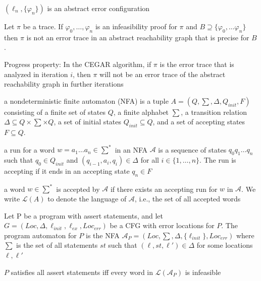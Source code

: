 \documentclass[landscape, a4paper]{article}
\begin{document}
\begin{minipage}[t]{0.2\linewidth}
\begin{betterlist}
\begin{betterlist}
			\item $(\ell_n, \{ \varphi_n\} )$ is an abstract error configuration
		\end{betterlist}
		\item Let $\pi$  be a trace. If $\varphi_0,\ldots , \varphi_n$ is an infeasibility proof for $\pi$  and $B \supseteq \{ \varphi_0,\ldots \varphi_n\}$  then $\pi$  is not an error trace in an abstract reachability graph that is precise for $B$. 
		\item \alert{Progress property:} In the CEGAR algorithm, if $\pi$ is the error trace that is analyzed in iteration $i$, then $\pi$ will not be an error trace of the abstract reachability graph in further iterations
	\end{betterlist}
	\begin{betterlist}
		\item a \alert{nondeterministic finite automaton (NFA)} is a tuple $A = (Q, \sum , \Delta , Q_{init}, F)$ consisting of a finite set of states $Q$, a finite alphabet $\sum$, a transition relation $\Delta \subseteq Q × \sum  × Q$, a set of initial states $Q_{init} \subseteq Q$, and a set of accepting states $F \subseteq Q$.
		\begin{betterlist}
			\item a \alert{run} for a word $w = a_1\ldots a_n \in \sum^{*}$ in an NFA $\mathcal{A}$ is a sequence of states $q_0q_1\ldots q_n$ such that $q_0 \in Q_{init}$ and $(q_{i−1}, a_{i}, q_{i}) \in \Delta$ for all $i \in \{1,\ldots , n\}$. The run is \alert{accepting} if it ends in an accepting state $q_n \in F$
			\item a word $w \in \sum ^*$ is \alert{accepted} by $\mathcal{A}$ if there exists an accepting run for $w$ in $\mathcal{A}$. We write $\mathcal{L}(A)$ to denote the \alert{language of $\mathcal{A}$}, i.e., the set of all accepted words
		\end{betterlist}
		\item Let P be a program with assert statements, and let $G = (Loc, \Delta , \ell_{init}, \ell_{ex}, Loc_{err})$ be a CFG with error locations for $P$. The \alert{program automaton} for $P$ is the NFA $\mathcal{A}_P = (Loc, \sum , \Delta , \{ \ell_{init}\} , Loc_{err})$ where $\sum$ is the set of all statements $st$ such that $(\ell, st, \ell') \in \Delta$ for some locations $\ell, \ell'$
		\begin{betterlist}
			\item $P$ satisfies all assert statements iff every word in $\mathcal{L}(\mathcal{A}_P)$ is infeasible

\end{betterlist}
\end{betterlist}
\end{minipage}
\end{document}
